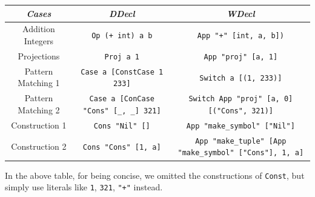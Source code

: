 \documentclass[a1,portrait]{a1poster}
\begin{document}
\begin{multicols}{2}
\begin{center}
\begin{tabular}{ |c|c|c| } 
 \toprule
 \textit{Cases} & \textit{DDecl} & \textit{WDecl} \\
 \midrule
 Addition Integers & \lstinline!Op (+ int) a b!  & \lstinline!App "+" [int, a, b])! \\
 \midrule
 Projections & \lstinline!Proj a 1! & \lstinline!App "proj" [a, 1]!                 \\
 \midrule
 Pattern Matching 1 & \lstinline!Case a [ConstCase 1 233]! & \lstinline!Switch a [(1, 233)]! \\
 \midrule
 Pattern Matching 2 & \lstinline!Case a [ConCase "Cons" [_, _] 321]! & \lstinline!Switch App "proj" [a, 0] [("Cons", 321)]! \\
 \midrule
 Construction 1 & \lstinline!Cons "Nil" []! & \lstinline!App "make_symbol" ["Nil"]! \\
 \midrule
 Construction 2 & \lstinline!Cons "Cons" [1, a]! & \lstinline!App "make_tuple" [App "make_symbol" ["Cons"], 1, a]! \\
 \bottomrule
\end{tabular}
\end{center}

In the above table, for being concise, we omitted the constructions of \lstinline!Const!,
but simply use literals like \lstinline!1!, \lstinline!321!, \lstinline!"+"! instead.







\color{FireBrick} %


\end{multicols}
\end{document}
